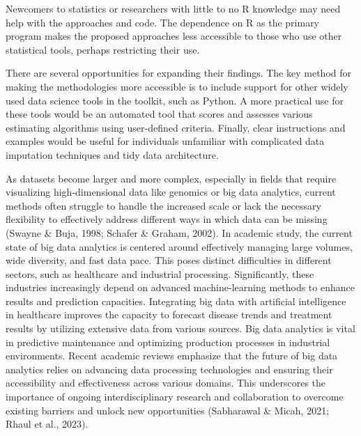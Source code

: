 \documentclass[print]{nuthesis}
\begin{document}
Newcomers to statistics or researchers with little to no R knowledge may need help with the approaches and code.
The dependence on R as the primary program makes the proposed approaches less accessible to those who use other statistical tools, perhaps restricting their use.

There are several opportunities for expanding their findings.
The key method for making the methodologies more accessible is to include support for other widely used data science tools in the toolkit, such as Python.
A more practical use for these tools would be an automated tool that scores and assesses various estimating algorithms using user-defined criteria.
Finally, clear instructions and examples would be useful for individuals unfamiliar with complicated data imputation techniques and tidy data architecture.

As datasets become larger and more complex, especially in fields that require visualizing high-dimensional data like genomics or big data analytics, current methods often struggle to handle the increased scale or lack the necessary flexibility to effectively address different ways in which data can be missing (Swayne \& Buja, 1998; Schafer \& Graham, 2002).
In academic study, the current state of big data analytics is centered around effectively managing large volumes, wide diversity, and fast data pace.
This poses distinct difficulties in different sectors, such as healthcare and industrial processing.
Significantly, these industries increasingly depend on advanced machine-learning methods to enhance results and prediction capacities.
Integrating big data with artificial intelligence in healthcare improves the capacity to forecast disease trends and treatment results by utilizing extensive data from various sources.
Big data analytics is vital in predictive maintenance and optimizing production processes in industrial environments.
Recent academic reviews emphasize that the future of big data analytics relies on advancing data processing technologies and ensuring their accessibility and effectiveness across various domains.
This underscores the importance of ongoing interdisciplinary research and collaboration to overcome existing barriers and unlock new opportunities (Sabharawal \& Micah, 2021; Rhaul et al., 2023).
\end{document}
